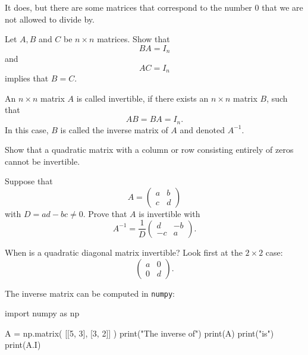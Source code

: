 \documentclass{article}
\begin{document}
It does, but there are some matrices that correspond to the number $0$ that we are not allowed
to divide by.

\beginshex
Let $A, B$ and $C$ be $n\times n$ matrices. Show that
$$
B A = I_n
$$
and
$$
A C = I_n
$$
implies that $B = C$.
\endshex


\begin{definition}
An $n\times n$ matrix $A$ is called invertible, if there exists an  $n\times n$ matrix $B$, such that 
$$
A B = B A = I_n.
$$
In this case, $B$ is called the inverse matrix of $A$ and denoted $A^{-1}$.
\end{definition}



\beginshex
Show that a quadratic matrix with a column or row consisting entirely of zeros cannot
be invertible.
\endshex

\beginshex
Suppose that
$$
A = \begin{pmatrix}
  a & b\\
  c & d
  \end{pmatrix}
  $$
  with $D = a d - b c\neq 0$. Prove that $A$ is invertible with
  $$
  A^{-1} = \frac{1}{D}\begin{pmatrix} d & -b\\ -c & a \end{pmatrix}.
  $$
\endshex


\beginshex
When is a quadratic diagonal matrix invertible? Look first at the $2\times 2$ case:
$$
\begin{pmatrix}
  a & 0\\
  0 & d
\end{pmatrix}.
$$
\endshex

The inverse matrix can be computed in \texttt{numpy}:

\begin{sage}
import numpy as np

A = np.matrix( [[5, 3], [3, 2]] )
print("The inverse of")
print(A)
print("is")
print(A.I)

\end{sage}
\end{document}
